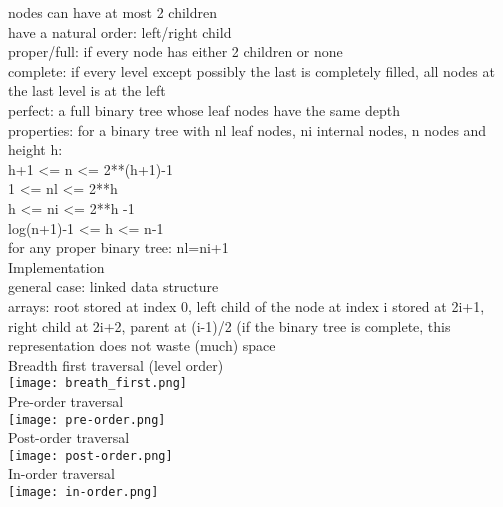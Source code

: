 {\tiny nodes can have at most 2 children\\
have a natural order: left/right child\\
proper/full: if every node has either 2 children or none\\
complete: if every level except possibly the last is completely filled, all nodes at the last level is at the left\\
perfect: a full binary tree whose leaf nodes have the same depth\\
properties: for a binary tree with nl leaf nodes, ni internal nodes, n nodes and height h:\\
h+1 <= n <= 2**(h+1)-1\\
1 <= nl <= 2**h\\
h <= ni <= 2**h -1\\
log(n+1)-1 <= h <= n-1\\
for any proper binary tree: nl=ni+1
}\\
\scriptsize{Implementation} \\
{\tiny general case: linked data structure\\
arrays: root stored at index 0, left child of the node at index i stored at 2i+1, right child at 2i+2, parent at (i-1)/2 (if the binary tree is complete, this representation does not waste (much) space
}\\
\scriptsize{Breadth first traversal (level order)}\\ 
\texttt{[image: breath\_first.png]}\\
\scriptsize{Pre-order traversal} \\
\texttt{[image: pre-order.png]}\\
\scriptsize{Post-order traversal} \\
\texttt{[image: post-order.png]}\\
\scriptsize{In-order traversal} \\
\texttt{[image: in-order.png]}